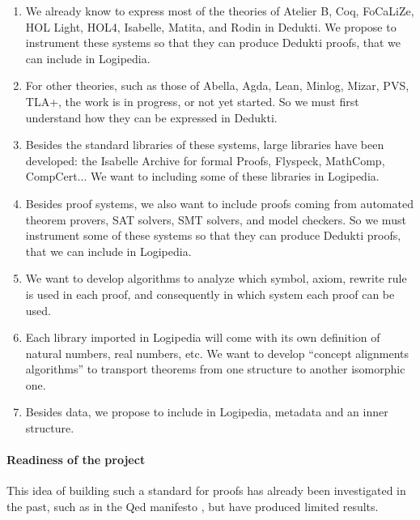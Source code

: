 \begin{enumerate}
\item We already know to express most of the theories of {\sc Atelier B},
{\sc Coq}, {\sc FoCaLiZe}, {\sc HOL Light}, {\sc HOL4}, {\sc
Isabelle}, {\sc Matita}, and {\sc Rodin} in {\sc Dedukti}. We propose
to instrument these systems so that they can produce {\sc Dedukti}
proofs, that we can include in {\sc Logipedia}.

\item
For other theories, such as those of {\sc Abella}, {\sc Agda}, {\sc
Lean}, {\sc Minlog}, {\sc Mizar}, {\sc PVS}, {\sc TLA+}, the work is
in progress, or not yet started.  So we must first understand how they
can be expressed in {\sc Dedukti}.

\item
Besides the standard libraries of these systems, large libraries
have been developed: the Isabelle Archive for formal Proofs,
Flyspeck, MathComp, CompCert...  We want to including some of
these libraries in {\sc Logipedia}.
  
\item
Besides proof systems, we also want to include proofs coming from
automated theorem provers, SAT solvers, SMT solvers, and model
checkers.  So we must instrument some of these systems so that they
can produce {\sc Dedukti} proofs, that we can include in {\sc
Logipedia}.

\item
We want to develop algorithms to analyze which symbol, axiom, rewrite
rule is used in each proof, and consequently in which system each proof
can be used.

\item
Each library imported in {\sc Logipedia} will come with its own
definition of natural numbers, real numbers, etc. We want to develop
``concept alignments algorithms'' to transport theorems from one
structure to another isomorphic one.

\item 
Besides data, we propose to include in {\sc Logipedia}, metadata and
an inner structure.
\end{enumerate}


\paragraph{Readiness of the project}

This idea of building such a standard for proofs has already been
investigated in the past, such as in the Qed manifesto \cite{Qed94}, but
have produced limited results.

